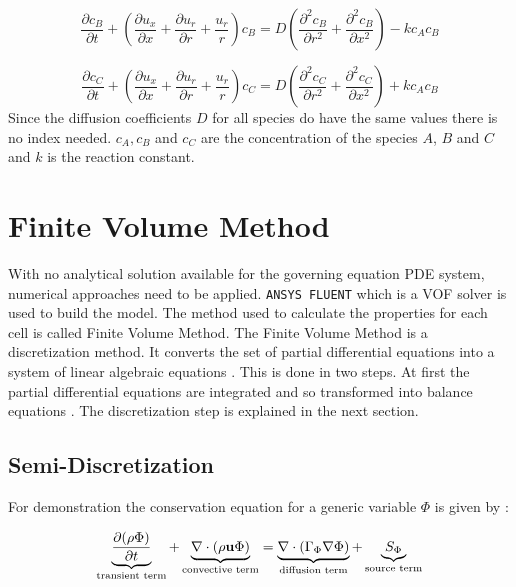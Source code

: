\documentclass[../thesis.tex]{subfiles}
\begin{document}
\begin{equation}
	\dfrac{\partial c_B}{\partial t} + \left( \dfrac{\partial u_x}{ \partial x} + \dfrac{\partial u_r}{ \partial r} + \dfrac{u_r}{r} \right) c_B =  D \left( \dfrac{\partial^2 c_B} {\partial r^2} + \dfrac{\partial^2 c_B}{\partial x^2} \right) - kc_A c_B
\end{equation}

\begin{equation}
	\dfrac{\partial c_C}{\partial t} + \left( \dfrac{\partial u_x}{ \partial x} + \dfrac{\partial u_r}{ \partial r} + \dfrac{u_r}{r} \right) c_C =  D \left( \dfrac{\partial^2 c_C} {\partial r^2} + \dfrac{\partial^2 c_C}{\partial x^2} \right) + kc_A c_B
\end{equation}
Since the diffusion coefficients $D$ for all species do have the same values there is no index needed. $c_A, c_B$ and $c_C$ are the concentration of the species $A$, $B$ and $C$ and $k$ is the reaction constant. 

\section{Finite Volume Method}
\label{sec: finite_volume}
With no analytical solution available for the governing equation PDE system, numerical approaches need to be applied. \texttt{ANSYS FLUENT} which is a VOF solver is used to build the model. The method used to calculate the properties for each cell is called Finite Volume Method.
The Finite Volume Method is a discretization method. It converts the set of partial differential equations into a system of linear algebraic equations \cite{darwish2021finite}. This is done in two steps. At first the partial differential equations are integrated and so transformed into balance equations \cite{darwish2021finite}. The discretization step is explained in the next section.

\subsection{Semi-Discretization}

For demonstration the conservation equation for a generic variable $ \Phi $ is given by \cite{darwish2021finite}:

\begin{equation}
	\label{eqn:conserv_eq}
	\underbrace{\dfrac{\partial(\rho \Phi)}{\partial t}}_{\text{transient term}} + \underbrace{\nabla \cdot (\rho \bold{u} \Phi)}_{\text{convective term}} = \underbrace{\nabla \cdot (\Gamma_\Phi \nabla \Phi)}_{\text{diffusion term}} + \underbrace{S_\Phi}_{\text{source term}}
\end{equation}
\end{document}
